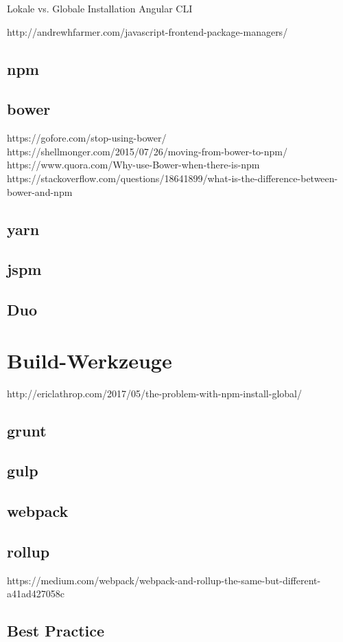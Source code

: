 Lokale vs. Globale Installation
Angular CLI

http://andrewhfarmer.com/javascript-frontend-package-managers/

\subsection{npm}
\label{sub:npm}
\subsection{bower}
\label{sub:bower}
https://gofore.com/stop-using-bower/
https://shellmonger.com/2015/07/26/moving-from-bower-to-npm/
https://www.quora.com/Why-use-Bower-when-there-is-npm
https://stackoverflow.com/questions/18641899/what-is-the-difference-between-bower-and-npm
\subsection{yarn}
\label{sub:yarn}
\subsection{jspm}
\label{sub:jspm}
\subsection{Duo}
\label{sub:duo}



\section{Build-Werkzeuge}
\label{sec:build-tools}

http://ericlathrop.com/2017/05/the-problem-with-npm-install-global/

\subsection{grunt}
\label{sub:grunt}
\subsection{gulp}
\label{sub:gulp}
\subsection{webpack}
\label{sub:webpack}
\subsection{rollup}
\label{sub:rollup}
https://medium.com/webpack/webpack-and-rollup-the-same-but-different-a41ad427058c
\subsection{Best Practice}
\label{sub:build-tools-best-practices}
